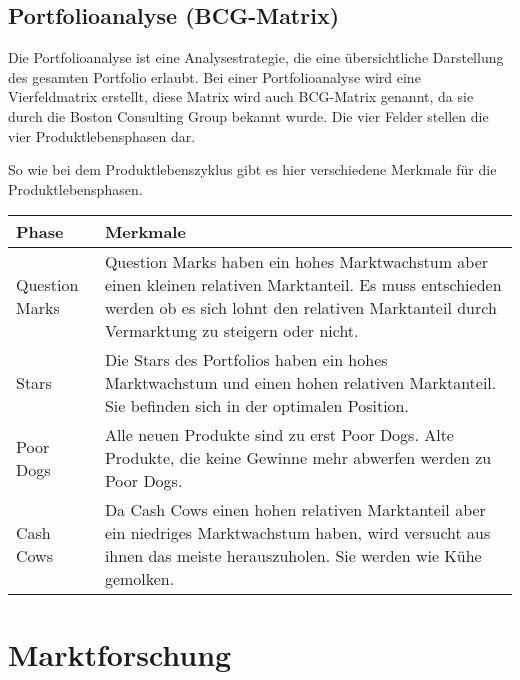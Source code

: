 \subsection{Portfolioanalyse (BCG-Matrix)}
\begin{flushleft}
    Die Portfolioanalyse ist eine Analysestrategie, die eine übersichtliche Darstellung des gesamten
    Portfolio erlaubt. Bei einer Portfolioanalyse wird eine Vierfeldmatrix erstellt, diese Matrix wird auch BCG-Matrix
    genannt, da sie durch die Boston Consulting Group bekannt wurde. Die vier Felder stellen die vier Produktlebensphasen dar.
\end{flushleft}
\begin{center}
\end{center}

\begin{flushleft}
    So wie bei dem Produktlebenszyklus gibt es hier verschiedene Merkmale für die Produktlebensphasen.
\end{flushleft}
\begin{center}
\begin{tabular}{|l|p{8cm}|}
    \hline
    \textbf{Phase} & \textbf{Merkmale} \\
    \hline
    Question Marks & Question Marks haben ein hohes Marktwachstum aber einen kleinen relativen Marktanteil. Es muss entschieden werden ob es sich lohnt den relativen Marktanteil durch Vermarktung zu steigern oder nicht. \\
    \hline
    Stars & Die Stars des Portfolios haben ein hohes Marktwachstum und einen hohen relativen Marktanteil. Sie befinden sich in der optimalen Position. \\
    \hline
    Poor Dogs & Alle neuen Produkte sind zu erst Poor Dogs. Alte Produkte, die keine Gewinne mehr abwerfen werden zu Poor Dogs. \\
    \hline
    Cash Cows & Da Cash Cows einen hohen relativen Marktanteil aber ein niedriges Marktwachstum haben, wird versucht aus ihnen das meiste herauszuholen. Sie werden wie Kühe gemolken. \\
    \hline
\end{tabular}
\end{center}

\section{Marktforschung}
